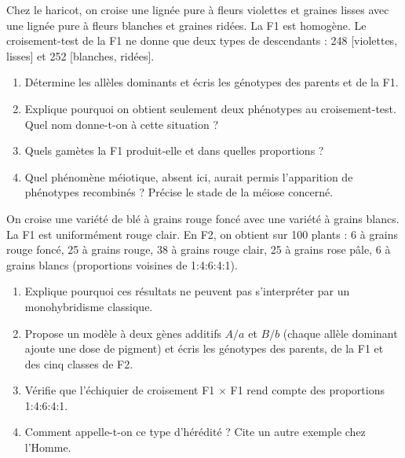 \documentclass[11pt]{article}
\newcounter{popsec}
\newcounter{popsub}
\newcommand{\courssub}[1]{%
  \stepcounter{popsub}%
  \par\vspace{9pt}\noindent{\popxbold\fontsize{11.5}{13}\selectfont\color{popink}{\color{poporange}\thepopsec.\thepopsub}\hspace{6pt}#1}\par\nopagebreak\vspace{4pt}
}
\begin{document}
\begin{exercice}
Chez le haricot, on croise une lignée pure à fleurs violettes et graines lisses avec une lignée pure à fleurs blanches et graines ridées. La F1 est homogène. Le croisement-test de la F1 ne donne que deux types de descendants : 248 [violettes, lisses] et 252 [blanches, ridées].
\begin{enumerate}
\item Détermine les allèles dominants et écris les génotypes des parents et de la F1.
\item Explique pourquoi on obtient seulement deux phénotypes au croisement-test. Quel nom donne-t-on à cette situation ?
\item Quels gamètes la F1 produit-elle et dans quelles proportions ?
\item Quel phénomène méiotique, absent ici, aurait permis l'apparition de phénotypes recombinés ? Précise le stade de la méiose concerné.
\end{enumerate}
\end{exercice}

\begin{exercice}
On croise une variété de blé à grains rouge foncé avec une variété à grains blancs. La F1 est uniformément rouge clair. En F2, on obtient sur 100 plants : 6 à grains rouge foncé, 25 à grains rouge, 38 à grains rouge clair, 25 à grains rose pâle, 6 à grains blancs (proportions voisines de 1:4:6:4:1).
\begin{enumerate}
\item Explique pourquoi ces résultats ne peuvent pas s'interpréter par un monohybridisme classique.
\item Propose un modèle à deux gènes additifs $A/a$ et $B/b$ (chaque allèle dominant ajoute une dose de pigment) et écris les génotypes des parents, de la F1 et des cinq classes de F2.
\item Vérifie que l'échiquier de croisement F1 $\times$ F1 rend compte des proportions 1:4:6:4:1.
\item Comment appelle-t-on ce type d'hérédité ? Cite un autre exemple chez l'Homme.
\end{enumerate}
\end{exercice}

\courssub{Je me prépare au Bac}
\end{document}
